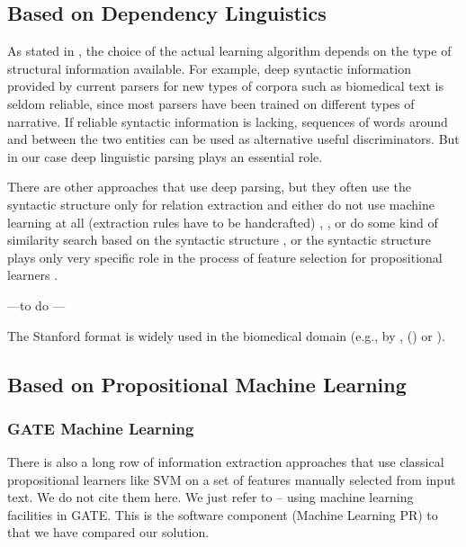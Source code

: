 \subsection{Based on Dependency Linguistics}
As stated in \citep{Bunescu:phd}, the choice of the actual learning algorithm depends on the type of structural information available. For example, deep syntactic information provided by current parsers for new types of corpora such as biomedical text is seldom reliable, since most parsers have been trained on different types of narrative. If reliable syntactic information is lacking, sequences of words around and between the two entities can be used as alternative useful discriminators.
But in our case deep linguistic parsing plays an essential role.


There are other approaches that use deep parsing, but they often use the syntactic structure only for relation extraction and either do not use machine learning at all (extraction rules have to be handcrafted) 
\citep{Yakushiji2001},
\citep{RelEx},
\citep{Buyko:dependencyGraphs}
or do some kind of similarity search based on the syntactic structure
\citep{Etzioni08informationExtraction},
\citep{Wang:SimilarityTreeSkeletons}
or the syntactic structure plays only very specific role in the process of feature selection for propositional learners %
\citep{Bunescu:DependencyPaths}.

---to do ---

The
Stanford format is widely used in the biomedical
domain (e.g., by \cite{MiyaoACL2008}, (\cite{Yakushiji2001}) or
\cite{Clegg2005Evaluating}).


\subsection{Based on Propositional Machine Learning}
\subsubsection{GATE Machine Learning}
There is also a long row of information extraction approaches that use classical propositional learners like SVM on a set of features manually selected from input text. We do not cite them here. We just refer to \citep{Yaoyong09a} -- using machine learning facilities in GATE. This is the software component (Machine Learning PR) to that we have compared our solution. 

